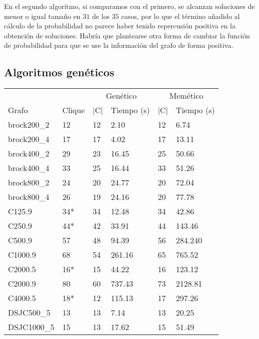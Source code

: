 En el segundo algoritmo, si comparamos con el primero, se alcanzan soluciones de
menor o igual tamaño en $31$ de los $35$ casos, por lo que el término añadido
al cálculo de la probabilidad no parece haber tenido repercusión positiva en la
obtención de soluciones. Habría que plantearse otra forma de cambiar la función de
probabilidad para que se use la información del grafo de forma positiva.

\subsection{Algoritmos genéticos}

\begin{small}
\begin{longtable}{l l l l l l}
  \label{table:geneticos}\\
    && \multicolumn{2}{c}{Genético} & \multicolumn{2}{c}{Memético} \\ \cline{3-6}
    Grafo              & Clique & |C| & Tiempo (s) & |C| & Tiempo (s) \\ \hline
    \endhead
    \endfoot
    brock200\_2        & 12 & 12 & 2.10 & 12 & 6.74\\ \hline
    brock200\_4        & 17 & 17 & 4.02 & 17 & 13.11\\ \hline
    brock400\_2        & 29 & 23 & 16.45 & 25 & 50.66\\ \hline
    brock400\_4        & 33 & 25 & 16.44 & 33 & 51.26\\ \hline
    brock800\_2        & 24 & 20 & 24.77 & 20 & 72.04\\ \hline
    brock800\_4        & 26 & 19 & 24.16 & 20 & 77.78\\ \hline
    C125.9             & 34* & 34 & 12.48 & 34 & 42.86\\ \hline
    C250.9             & 44* & 42 & 33.91 & 44 & 143.46\\ \hline
    C500.9             & 57 & 48 & 94.39 & 56 & 284.240\\ \hline
    C1000.9            & 68 & 54 & 261.16 & 65 & 765.52\\ \hline
    C2000.5            & 16* & 15 & 44.22 & 16 & 123.12\\ \hline
    C2000.9            & 80 & 60 & 737.43 & 73 & 2128.81\\ \hline
    C4000.5            & 18* & 12 & 115.13 & 17 & 297.26\\ \hline
    DSJC500\_5         & 13 & 13 & 7.14 & 13 & 20.25\\ \hline
    DSJC1000\_5        & 15 & 13 & 17.62 & 15 & 51.49\\ \hline

\end{longtable}
\end{small}
